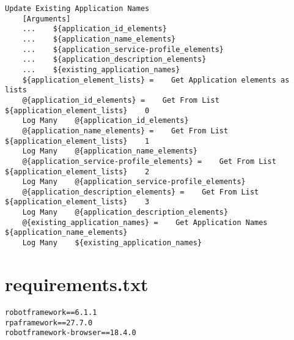 \begin{verbatim}
Update Existing Application Names
    [Arguments]
    ...    ${application_id_elements}
    ...    ${application_name_elements}
    ...    ${application_service-profile_elements}
    ...    ${application_description_elements}
    ...    ${existing_application_names}
    ${application_element_lists} =    Get Application elements as lists
    @{application_id_elements} =    Get From List    ${application_element_lists}    0
    Log Many    @{application_id_elements}
    @{application_name_elements} =    Get From List    ${application_element_lists}    1
    Log Many    @{application_name_elements}
    @{application_service-profile_elements} =    Get From List    ${application_element_lists}    2
    Log Many    @{application_service-profile_elements}
    @{application_description_elements} =    Get From List    ${application_element_lists}    3
    Log Many    @{application_description_elements}
    @{existing_application_names} =    Get Application Names    ${application_name_elements}
    Log Many    ${existing_application_names}

\end{verbatim}

\section{requirements.txt}

\begin{verbatim}
robotframework==6.1.1
rpaframework==27.7.0
robotframework-browser==18.4.0

\end{verbatim}


